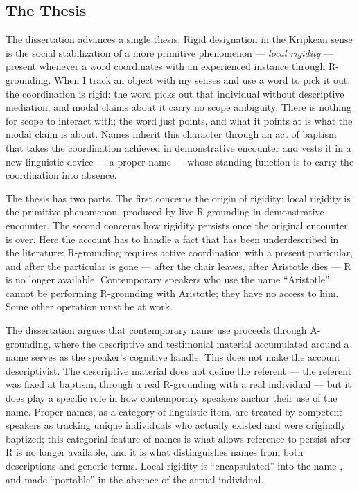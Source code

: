 \documentclass[10pt]{article}
\begin{document}
\subsection{The Thesis}\label{the-thesis}

The dissertation advances a single thesis. Rigid designation in the Kripkean sense is the social stabilization of a more primitive phenomenon --- \emph{local rigidity} --- present whenever a word coordinates with an experienced instance through R-grounding. When I track an object with my senses and use a word to pick it out, the coordination is rigid: the word picks out that individual without descriptive mediation, and modal claims about it carry no scope ambiguity. There is nothing for scope to interact with; the word just points, and what it points at is what the modal claim is about. Names inherit this character through an act of baptism that takes the coordination achieved in demonstrative encounter and vests it in a new linguistic device --- a proper name --- whose standing function is to carry the coordination into absence.

The thesis has two parts. The first concerns the origin of rigidity: local rigidity is the primitive phenomenon, produced by live R-grounding in demonstrative encounter. The second concerns how rigidity persists once the original encounter is over. Here the account has to handle a fact that has been underdescribed in the literature: R-grounding requires active coordination with a present particular, and after the particular is gone --- after the chair leaves, after Aristotle dies --- R is no longer available. Contemporary speakers who use the name ``Aristotle'' cannot be performing R-grounding with Aristotle; they have no access to him. Some other operation must be at work.

The dissertation argues that contemporary name use proceeds through A-grounding, where the descriptive and testimonial material accumulated around a name serves as the speaker's cognitive handle. This does not make the account descriptivist. The descriptive material does not define the referent --- the referent was fixed at baptism, through a real R-grounding with a real individual --- but it does play a specific role in how contemporary speakers anchor their use of the name. Proper names, as a category of linguistic item, are treated by competent speakers as tracking unique individuals who actually existed and were originally baptized; this categorial feature of names is what allows reference to persist after R is no longer available, and it is what distinguishes names from both descriptions and generic terms. Local rigidity is ``encapsulated'' into the name , and made ``portable'' in the absence of the actual individual.
\end{document}

